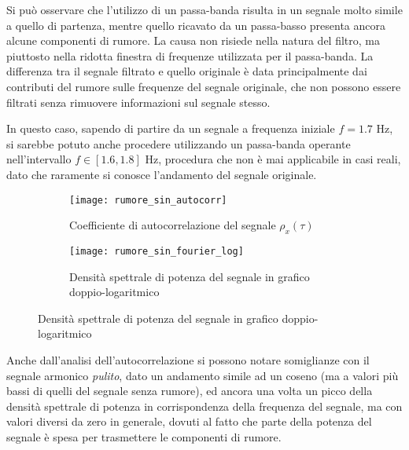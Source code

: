 \documentclass{article} %
\begin{document}
Si può osservare che l'utilizzo di un passa-banda risulta in un segnale molto simile a quello di partenza, mentre quello ricavato da un passa-basso presenta ancora alcune componenti di rumore. La causa non risiede nella natura del filtro, ma piuttosto nella ridotta finestra di frequenze utilizzata per il passa-banda. La differenza tra il segnale filtrato e quello originale è data principalmente dai contributi del rumore sulle frequenze del segnale originale, che non possono essere filtrati senza rimuovere informazioni sul segnale stesso.\par
In questo caso, sapendo di partire da un segnale a frequenza iniziale $f = 1.7$ Hz, si sarebbe potuto anche procedere utilizzando un passa-banda operante nell'intervallo $f \in [1.6, 1.8]$ Hz, procedura che non è mai applicabile in casi reali, dato che raramente si conosce l'andamento del segnale originale.\par
\begin{figure}[h!]
	\begin{subfigure}{0.5\textwidth}
		\texttt{[image: rumore\_sin\_autocorr]}
		\caption{Coefficiente di autocorrelazione del segnale $\rho_{x}(\tau)$}
	\end{subfigure}
	\begin{subfigure}{0.5\textwidth}
		\texttt{[image: rumore\_sin\_fourier\_log]}
		\caption{Densità spettrale di potenza del segnale in grafico doppio-logaritmico}
	\end{subfigure}
\end{figure}\par
Anche dall'analisi dell'autocorrelazione si possono notare somiglianze con il segnale armonico \textit{pulito}, dato un andamento simile ad un coseno (ma a valori più bassi di quelli del segnale senza rumore), ed ancora una volta un picco della densità spettrale di potenza in corrispondenza della frequenza del segnale, ma con valori diversi da zero in generale, dovuti al fatto che parte della potenza del segnale è spesa per trasmettere le componenti di rumore.
\newpage
\end{document}
